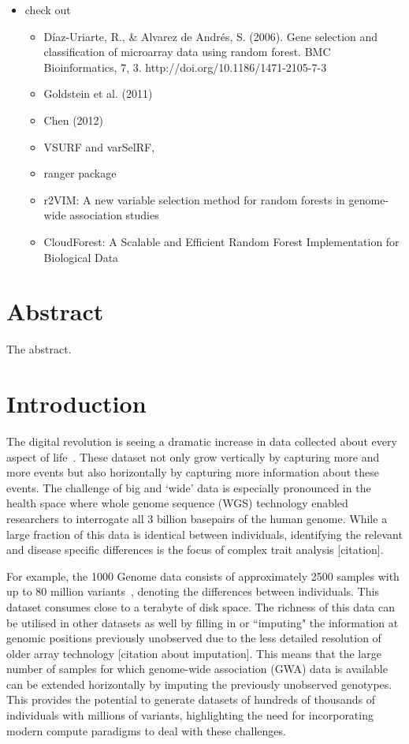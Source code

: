 \documentclass[10pt,a4paper]{article}  %
\let\oldmarginpar\marginpar
\renewcommand\marginpar[1]{\-\oldmarginpar[\raggedleft\footnotesize #1]%
{\raggedright\footnotesize #1}}
\begin{document}
\begin{itemize}
\item check out 
  \begin{itemize}
  \item D\'iaz-Uriarte, R., \& Alvarez de Andr\'es, S. (2006). Gene selection and classification of microarray data using random
    forest. BMC Bioinformatics, 7, 3. http://doi.org/10.1186/1471-2105-7-3
  \item Goldstein et al. (2011)
  \item Chen (2012)
  \item VSURF and  varSelRF, 
  \item ranger package
  \item  r2VIM: A new variable selection method for random forests in
    genome-wide association studies
  \item CloudForest: A Scalable and Efficient Random Forest Implementation for Biological Data
  \end{itemize}
\end{itemize}


\section*{Abstract}
The abstract.

\linenumbers

\section*{Introduction}

The digital revolution is seeing a dramatic increase in data collected about every aspect of 
life~\cite{Loebbecke2015}.  These dataset not only grow vertically by capturing more and more events but also
horizontally by capturing more information about these events.  The challenge of big and `wide' data is especially
pronounced in the health space where whole genome sequence (WGS) technology enabled researchers to interrogate all 3
billion basepairs of the human genome.  While a large fraction of this data is identical between individuals, \marginpar{base-pairs}
identifying the relevant and disease specific differences is the focus of complex trait analysis [citation].

For example, the 1000 Genome data consists of approximately 2500 samples with up to 80 million variants~\cite{1KG2012},
denoting the differences between individuals.  This dataset consumes close to a terabyte of disk space.  The richness of
this data can be utilised in other datasets as well by filling in or ``imputing" the information at genomic positions
previously unobserved due to the less detailed resolution of older array technology [citation about imputation].  This
means that the large number of samples for which genome-wide association (GWA) data is available~\cite{Welter2013} can
be extended horizontally by imputing the previously unobserved genotypes.  This provides the potential to generate
datasets of hundreds of thousands of individuals with millions of variants, highlighting the need for incorporating
modern compute paradigms to deal with these challenges.
\end{document}
